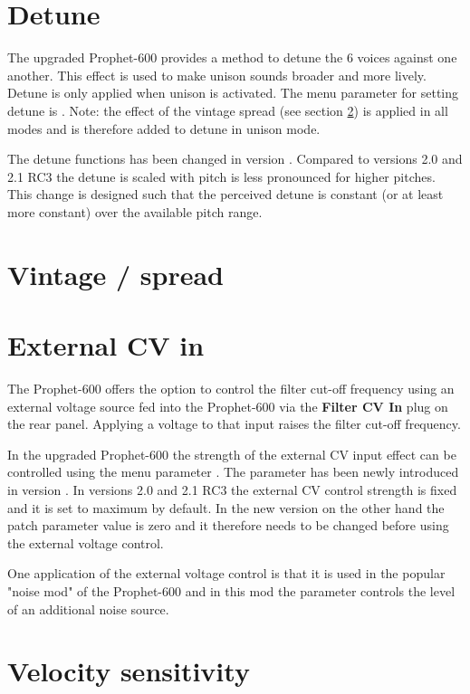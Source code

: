 \documentclass[landscape, 11pt, oneside, twoside]{report}
\newenvironment{flowtext}{\addmargin[0cm]{0cm}}{\endaddmargin} %
\begin{document}
\begin{flowtext}
\section{Detune}\label{detune}

The upgraded Prophet-600 provides a method to detune the 6 voices against one another. This effect is used to make unison sounds broader and more lively. Detune is only applied when unison is activated. The menu parameter for setting detune is \detune. Note: the effect of the vintage spread (see section \ref{spreadsett}) is applied in all modes and is therefore added to detune in unison mode. 

The detune functions has been changed in version \version. Compared to versions 2.0 and 2.1 RC3 the detune is scaled with pitch is less pronounced for higher pitches. This change is designed such that the perceived detune is constant (or at least more constant) over the available pitch range. 

\section{Vintage / spread}\label{spreadsett}



\section{External CV in}\label{extcv}

The Prophet-600 offers the option to control the filter cut-off frequency using an external voltage source fed into the Prophet-600 via the \textbf{Filter CV In} plug on the rear panel. Applying a voltage to that input raises the filter cut-off frequency.

In the upgraded Prophet-600 the strength of the external CV input effect can be controlled using the menu parameter \extvolt. The parameter has been newly introduced in version \version. In versions 2.0 and 2.1 RC3 the external CV control strength is fixed and it is set to maximum by default. In the new version on the other hand the patch parameter value is zero and it therefore needs to be changed before using the external voltage control. 

One application of the external voltage control is that it is used in the popular "noise mod" of the Prophet-600 and in this mod the parameter controls the level of an additional noise source. 

\section{Velocity sensitivity}\label{velocity}


\end{flowtext}
\end{document}
